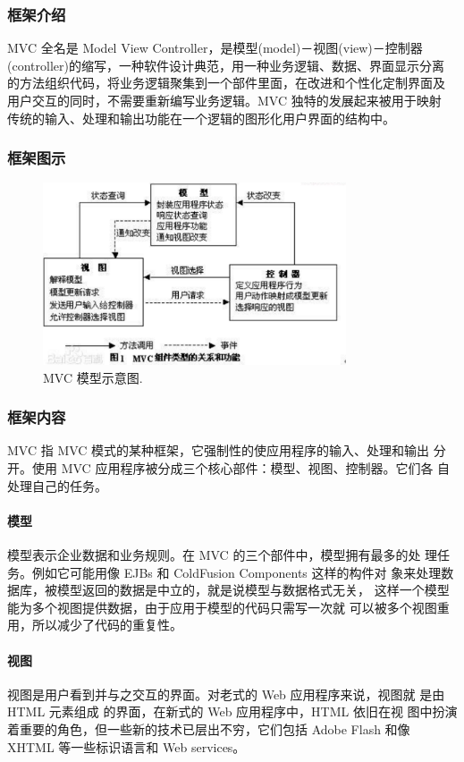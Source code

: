 \documentclass[14pt,a4paper]{article}
\begin{document}
\subsubsection{框架介绍}
MVC 全名是 Model View Controller，是模型(model)－视图(view)－控制器
(controller)的缩写，一种软件设计典范，用一种业务逻辑、数据、界面显示分离
的方法组织代码，将业务逻辑聚集到一个部件里面，在改进和个性化定制界面及
用户交互的同时，不需要重新编写业务逻辑。MVC 独特的发展起来被用于映射
传统的输入、处理和输出功能在一个逻辑的图形化用户界面的结构中。

\subsubsection{框架图示}
\nopagebreak
\begin{figure}[h]
\begin{center}
\includegraphics[width=0.8\textwidth]{image/mvc} %
\caption{MVC 模型示意图.}
\end{center}
\end{figure}

\subsubsection{框架内容}
MVC 指 MVC 模式的某种框架，它强制性的使应用程序的输入、处理和输出
分开。使用 MVC 应用程序被分成三个核心部件：模型、视图、控制器。它们各
自处理自己的任务。
\paragraph*{模型}
模型表示企业数据和业务规则。在 MVC 的三个部件中，模型拥有最多的处
理任务。例如它可能用像 EJBs 和 ColdFusion Components 这样的构件对
象来处理数据库，被模型返回的数据是中立的，就是说模型与数据格式无关，
这样一个模型能为多个视图提供数据，由于应用于模型的代码只需写一次就
可以被多个视图重用，所以减少了代码的重复性。
\paragraph*{视图}
视图是用户看到并与之交互的界面。对老式的 Web 应用程序来说，视图就
是由 HTML 元素组成
的界面，在新式的 Web 应用程序中，HTML 依旧在视
图中扮演着重要的角色，但一些新的技术已层出不穷，它们包括 Adobe Flash
和像 XHTML 等一些标识语言和 Web services。
\end{document}
